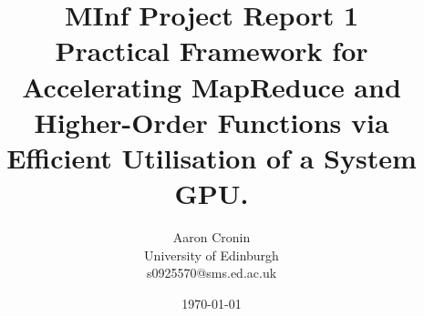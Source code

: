 \begin{titlepage}
  \title{{\small MInf Project Report 1}\\Practical Framework for Accelerating MapReduce and Higher-Order Functions via Efficient Utilisation of a System GPU.}   %
\author{Aaron Cronin\\University of Edinburgh\\ s0925570@sms.ed.ac.uk}         %

\date{\today}    %
\end{titlepage}

